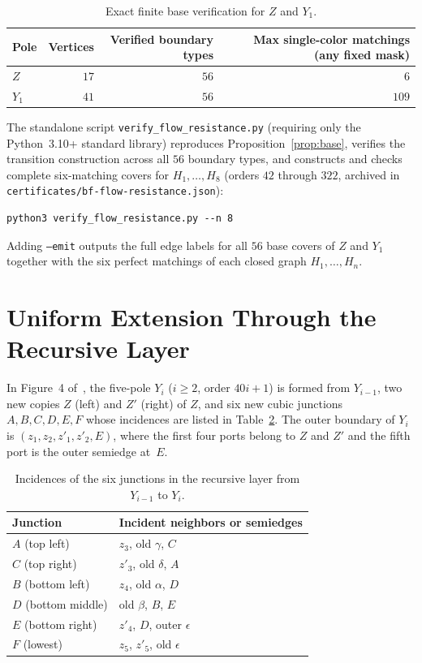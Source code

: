 \documentclass[11pt]{article}
\begin{document}
\begin{table}[ht]
\centering
\caption{Exact finite base verification for $Z$ and $Y_1$.}
\label{tab:base}
\begin{tabular}{@{}lrrr@{}}
\toprule
Pole & Vertices & Verified boundary types & Max single-color matchings (any fixed mask) \\
\midrule
$Z$   & $17$ & $56$ & $6$   \\
$Y_1$ & $41$ & $56$ & $109$ \\
\bottomrule
\end{tabular}
\end{table}

The standalone script \texttt{verify\_flow\_resistance.py} (requiring only the Python~3.10+
standard library) reproduces Proposition~\ref{prop:base}, verifies the transition
construction across all $56$ boundary types, and constructs and checks complete
six-matching covers for $H_1,\dots,H_8$ (orders $42$ through $322$, archived in
\texttt{certificates/bf-flow-resistance.json}):
\begin{verbatim}
python3 verify_flow_resistance.py --n 8
\end{verbatim}
Adding \texttt{--emit} outputs the full edge labels for all $56$ base covers of $Z$ and
$Y_1$ together with the six perfect matchings of each closed graph $H_1,\dots,H_n$.

\section{Uniform Extension Through the Recursive Layer}

In Figure~4 of~\cite{MNP}, the five-pole $Y_i$ ($i \ge 2$, order $40i + 1$) is formed
from $Y_{i-1}$, two new copies $Z$ (left) and $Z'$ (right) of $Z$, and six new cubic
junctions $A, B, C, D, E, F$ whose incidences are listed in Table~\ref{tab:junctions}.
The outer boundary of $Y_i$ is $(z_1, z_2, z'_1, z'_2, E)$, where the first four ports
belong to $Z$ and $Z'$ and the fifth port is the outer semiedge at~$E$.

\begin{table}[ht]
\centering
\caption{Incidences of the six junctions in the recursive layer from $Y_{i-1}$ to $Y_i$.}
\label{tab:junctions}
\begin{tabular}{@{}ll@{}}
\toprule
Junction & Incident neighbors or semiedges \\
\midrule
$A$ (top left)      & $z_3$, old $\gamma$, $C$ \\
$C$ (top right)     & $z'_3$, old $\delta$, $A$ \\
$B$ (bottom left)   & $z_4$, old $\alpha$, $D$ \\
$D$ (bottom middle) & old $\beta$, $B$, $E$ \\
$E$ (bottom right)  & $z'_4$, $D$, outer $\epsilon$ \\
$F$ (lowest)        & $z_5$, $z'_5$, old $\epsilon$ \\
\bottomrule
\end{tabular}
\end{table}
\end{document}
